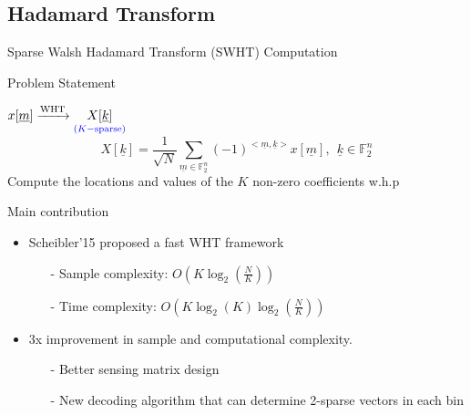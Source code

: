 \documentclass[10pt,xcolor=table]{beamer}
\newcommand{\F}{\mathbb{F}}
\newcommand{\kv}{\underline{k}}
\newcommand{\mv}{\underline{m}}
\begin{document}
%		

\subsection{Hadamard Transform}


%	
%
%	

\begin{frame}{Sparse Walsh Hadamard Transform (SWHT) Computation}
\vspace{-5pt}
\begin{block}{Problem Statement}
	\vspace{4pt} 	
	\centering	
	
	{$x[\mv]  \xrightarrow{\text{WHT}}  \underset{\color{blue}(K-\text{sparse})}{X[\kv]}$ \\
	
	\[X[\kv] = \frac{1}{\sqrt{N}}\sum_{\mv \in \F_2^n} (-1)^{<\mv,\kv>} x[\mv], ~~ \kv \in \F_2^n \]	
}
	\vspace{10pt}
	Compute the {\alert{locations}} and \alert{values} of the $K$ non-zero coefficients w.h.p
\end{block}

\pause

 \begin{block}{Main contribution}
		\begin{itemize} \itemsep1pt \parskip0pt 
			\item Scheibler'15 proposed a fast WHT framework
				\begin{itemize}
					\item[-] Sample complexity: $O(K \log_2 (\frac{N}{K}))$
					\item[-] Time complexity:  $O(K \log_2(K) \log_2(\frac{N}{K}))$
				\end{itemize}
			\item {\color{blue} 3x improvement} in sample and computational complexity.
				\begin{itemize}
					\item[-] Better sensing matrix design
					\item[-] New decoding algorithm that can determine {\color{blue} 2-sparse vectors} in each bin
				\end{itemize}
		\end{itemize} 	          			
\end{block}
\end{frame}
\end{document}
